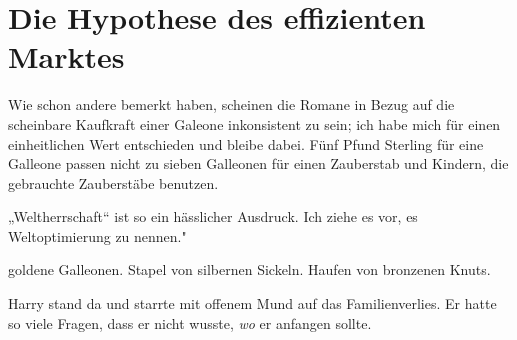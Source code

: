 \chapter{Die Hypothese des effizienten Marktes}

\begin{chapterOpeningAuthorNote}
% 
Wie schon andere bemerkt haben, scheinen die Romane in Bezug auf die scheinbare Kaufkraft einer Galeone inkonsistent zu sein; ich habe mich für einen einheitlichen Wert entschieden und bleibe dabei. Fünf Pfund Sterling für eine Galleone passen nicht zu sieben Galleonen für einen Zauberstab und Kindern, die gebrauchte Zauberstäbe benutzen.
\end{chapterOpeningAuthorNote}
\begin{chapterOpeningQuote}
„Weltherrschaft“ ist so ein hässlicher Ausdruck. Ich ziehe es vor, es Weltoptimierung zu nennen."
\end{chapterOpeningQuote}

 goldene Galleonen. Stapel von silbernen Sickeln. Haufen von bronzenen Knuts.

\hplettrineextrapara
Harry stand da und starrte mit offenem Mund auf das Familienverlies. Er hatte so viele Fragen, dass er nicht wusste, \emph{wo} er anfangen sollte.

